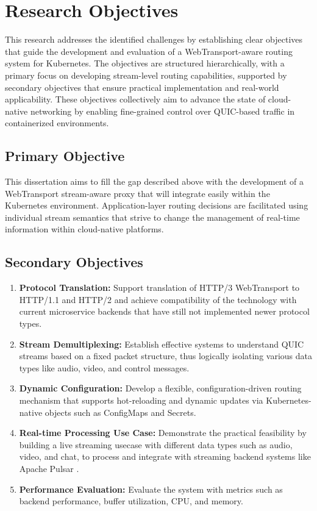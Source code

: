 \section{Research Objectives}

This research addresses the identified challenges by establishing clear objectives that guide the development and evaluation of a WebTransport-aware routing system for Kubernetes. The objectives are structured hierarchically, with a primary focus on developing stream-level routing capabilities, supported by secondary objectives that ensure practical implementation and real-world applicability. These objectives collectively aim to advance the state of cloud-native networking by enabling fine-grained control over QUIC-based traffic in containerized environments.

\subsection{Primary Objective}

This dissertation aims to fill the gap described above with the development of a WebTransport stream-aware proxy that will integrate easily within the Kubernetes environment. Application-layer routing decisions are facilitated using individual stream semantics that strive to change the management of real-time information within cloud-native platforms.

\subsection{Secondary Objectives}

\begin{enumerate}
\item \textbf{Protocol Translation:} Support translation of HTTP/3 WebTransport to HTTP/1.1 and HTTP/2 \cite{rfc7540} and achieve compatibility of the technology with current microservice backends that have still not implemented newer protocol types.

\item \textbf{Stream Demultiplexing:} Establish effective systems to understand QUIC streams based on a fixed packet structure, thus logically isolating various data types like audio, video, and control messages.

\item \textbf{Dynamic Configuration:} Develop a flexible, configuration-driven routing mechanism that supports hot-reloading and dynamic updates via Kubernetes-native objects such as ConfigMaps and Secrets.

\item \textbf{Real-time Processing Use Case:} Demonstrate the practical feasibility by building a live streaming usecase with different data types such as audio, video, and chat, to process and integrate with streaming backend systems like Apache Pulsar \cite{pulsar-helm-repo}.

\item \textbf{Performance Evaluation:} Evaluate the system with metrics such as backend performance, buffer utilization, CPU, and memory.

\end{enumerate}

